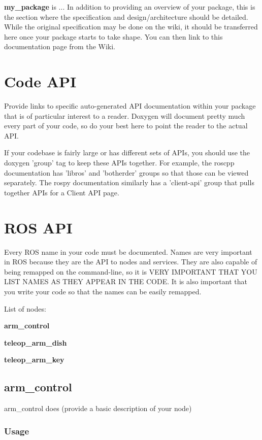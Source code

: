 

{\bfseries my\-\_\-package} is ... \-In addition to providing an overview of your package, this is the section where the specification and design/architecture should be detailed. \-While the original specification may be done on the wiki, it should be transferred here once your package starts to take shape. \-You can then link to this documentation page from the \-Wiki.\section{\-Code A\-P\-I}\label{index_codeapi}
\-Provide links to specific auto-\/generated \-A\-P\-I documentation within your package that is of particular interest to a reader. \-Doxygen will document pretty much every part of your code, so do your best here to point the reader to the actual \-A\-P\-I.

\-If your codebase is fairly large or has different sets of \-A\-P\-Is, you should use the doxygen 'group' tag to keep these \-A\-P\-Is together. \-For example, the roscpp documentation has 'libros' and 'botherder' groups so that those can be viewed separately. \-The rospy documentation similarly has a 'client-\/api' group that pulls together \-A\-P\-Is for a \-Client \-A\-P\-I page.\section{\-R\-O\-S A\-P\-I}\label{index_rosapi}
\-Every \-R\-O\-S name in your code must be documented. \-Names are very important in \-R\-O\-S because they are the \-A\-P\-I to nodes and services. \-They are also capable of being remapped on the command-\/line, so it is \-V\-E\-R\-Y \-I\-M\-P\-O\-R\-T\-A\-N\-T \-T\-H\-A\-T \-Y\-O\-U \-L\-I\-S\-T \-N\-A\-M\-E\-S \-A\-S \-T\-H\-E\-Y \-A\-P\-P\-E\-A\-R \-I\-N \-T\-H\-E \-C\-O\-D\-E. \-It is also important that you write your code so that the names can be easily remapped.

\-List of nodes\-:
\begin{DoxyItemize}
\item {\bfseries arm\-\_\-control} 
\item {\bfseries teleop\-\_\-arm\-\_\-dish} 
\item {\bfseries teleop\-\_\-arm\-\_\-key} 
\end{DoxyItemize}



\subsection{arm\-\_\-control}\label{index_arm_control}
arm\-\_\-control does (provide a basic description of your node)\subsubsection{\-Usage}\label{index_Usage}



